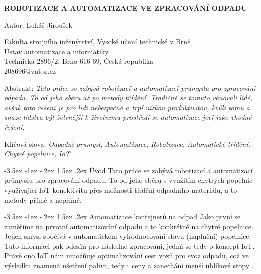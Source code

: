 \documentclass[a4paper,10pt]{article}
\makeatletter
\theoremstyle{definition}
\renewcommand\section{\@startsection {section}{1}{\z@}%
                                   {-3.5ex \@plus -1ex \@minus -.2ex}%
                                   {1.5ex \@plus.2ex}%
                                   {\large\bfseries}}
\makeatother
\begin{document}
\pagestyle{plain}

\begin{center}
{\bf \Large ROBOTIZACE A AUTOMATIZACE VE ZPRACOVÁNÍ ODPADU}
\end{center}

\smallskip
\begin{center}
{\large Autor: Lukáš Jiroušek}
\end{center}

\smallskip
\begin{center}
Fakulta strojního inženýrství, Vysoké učení technické v Brně\\
Ústav automatizace a informatiky\\
Technicka 2896/2, Brno 616 69, Česká republika\\
208696@vutbr.cz\\
\end{center}

\bigskip
\noindent Abstrakt: \textit{Tato práce se zabývá robotizací a automatizací průmyslu pro zpracování odpadu. To od jeho sběru až po metody třídění. Tradičně se tomuto věnovali lidé, avšak toto řešení je pro lidi nebezpečné a trpí nízkou produktivitou, kvůli tomu a snaze lidstva být šetrnější k životnímu prostředí se automatizace jeví jako vhodné řešení.}

\vspace*{10pt} \noindent Klíčová slova: \textit{Odpadní průmysl, Automatizace, Robotizace, Automatické třídění, Chytré popelnice, IoT}

\bigskip
\section{Úvod}
\label{sec:1}
Tato práce se zabývá robotizací a automatizací průmyslu pro zpracování odpadu. To od jeho sběru s využitím chytrých popelnic využívající IoT konektivitu přes možnosti třídění odpadního materiálu, a to metody přímé a nepřímé. 

\section{Automatizace kontejnerů na odpad}
\label{sec:2}
Jako první se zaměříme na prvotní automatizování odpadu a to konkrétně na chytré popelnice. Jejich smysl spočívá v automatickém vyhodnocovaní stavu (naplnění) popelnice. Tuto informaci pak odesílá pro následné zpracování, jedná se tedy o koncept IoT. Právě ono IoT nám umožňuje optimalizování cest vozů pro svoz odpadu, což ve výsledku znamená ušetření paliva, tedy i ceny a zanechání menší uhlíkové stopy \cite{9418359}\cite{Chaware2017SmartGM}.
\end{document}
